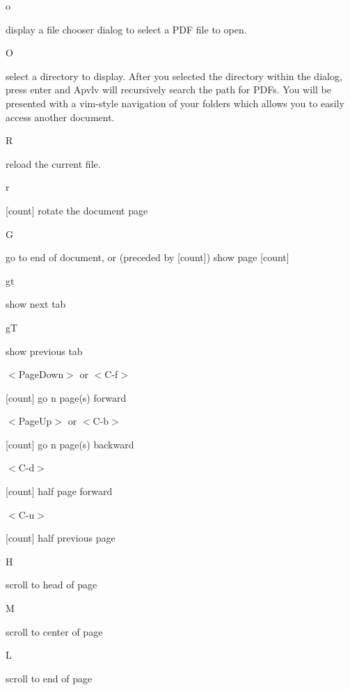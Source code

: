\documentclass[a4paper,12pt]{article}
\newcommand{\apvlv}{\textsf{Apvlv{ }}}
\begin{document}
\begin{description}

\item o

display a file chooser dialog to select a PDF file to open.

\item O

select a directory to display. After you selected the directory within the dialog, press enter and \apvlv will recursively search the path for PDFs. You will be presented with a vim-style navigation of your folders which allows you to easily access another document.

\item R

reload the current file.

\item r

[count] rotate the document page 

\item G

  go to end of document, or (preceded by [count]) show page [count]

\item gt

show next tab

\item gT

show previous tab

\item $<$PageDown$>$ or $<$C-f$>$

[count] go n page(s) forward

\item $<$PageUp$>$ or
$<$C-b$>$

[count] go n page(s) backward

\item $<$C-d$>$

[count] half page forward

\item $<$C-u$>$

[count] half previous page 

\item H

scroll to head of page

\item M

scroll to center of page

\item L

scroll to end of page


\end{description}
\end{document}
